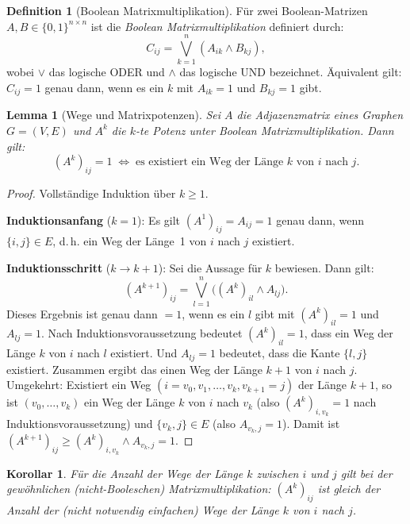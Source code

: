 ﻿\documentclass[a4paper,12pt,openany,oneside]{book}
\theoremstyle{definition}
\newtheorem{definition}{Definition}[chapter]
\theoremstyle{plain}
\newtheorem{lemma}{Lemma}[chapter]
\newtheorem{korollar}{Korollar}[chapter]
\theoremstyle{remark}
\begin{document}
\begin{definition}[Boolean Matrixmultiplikation]
  F\"ur zwei Boolean-Matrizen $A, B \in \{0,1\}^{n \times n}$ ist die
  \emph{Boolean Matrixmultiplikation} definiert durch:
  \[
    C_{ij} = \bigvee_{k=1}^{n} (A_{ik} \wedge B_{kj}),
  \]
  wobei $\vee$ das logische ODER und $\wedge$ das logische UND bezeichnet.
  \"Aquivalent gilt: $C_{ij} = 1$ genau dann, wenn es ein $k$ mit
  $A_{ik} = 1$ und $B_{kj} = 1$ gibt.
\end{definition}

\begin{lemma}[Wege und Matrixpotenzen]
  \label{lem:wege-matrizen}
  Sei $A$ die Adjazenzmatrix eines Graphen $G = (V,E)$ und $A^k$ die
  $k$-te Potenz unter Boolean Matrixmultiplikation. Dann gilt:
  \[
    (A^k)_{ij} = 1 \;\Leftrightarrow\;
    \text{es existiert ein Weg der L\"ange } k \text{ von } i \text{ nach } j.
  \]
\end{lemma}

\begin{proof}
  Vollst\"andige Induktion \"uber $k \geq 1$.

  \textbf{Induktionsanfang} ($k = 1$): Es gilt $(A^1)_{ij} = A_{ij} = 1$
  genau dann, wenn $\{i,j\} \in E$, d.\,h. ein Weg der L\"ange~1 von $i$
  nach $j$ existiert. \checkmark

  \textbf{Induktionsschritt} ($k \to k+1$): Sei die Aussage f\"ur $k$
  bewiesen. Dann gilt:
  \[
    (A^{k+1})_{ij} = \bigvee_{l=1}^{n}\bigl((A^k)_{il} \wedge A_{lj}\bigr).
  \]
  Dieses Ergebnis ist genau dann $= 1$, wenn es ein $l$ gibt mit
  $(A^k)_{il} = 1$ und $A_{lj} = 1$. Nach Induktionsvoraussetzung bedeutet
  $(A^k)_{il} = 1$, dass ein Weg der L\"ange $k$ von $i$ nach $l$ existiert.
  Und $A_{lj} = 1$ bedeutet, dass die Kante $\{l,j\}$ existiert. Zusammen
  ergibt das einen Weg der L\"ange $k+1$ von $i$ nach $j$.
  Umgekehrt: Existiert ein Weg $(i = v_0, v_1, \ldots, v_k, v_{k+1} = j)$
  der L\"ange $k+1$, so ist $(v_0, \ldots, v_k)$ ein Weg der L\"ange $k$ von
  $i$ nach $v_k$ (also $(A^k)_{i,v_k} = 1$ nach Induktionsvoraussetzung) und
  $\{v_k, j\} \in E$ (also $A_{v_k,j} = 1$). Damit ist
  $(A^{k+1})_{ij} \geq (A^k)_{i,v_k} \wedge A_{v_k,j} = 1$.
\end{proof}

\begin{korollar}
  F\"ur die Anzahl der Wege der L\"ange $k$ zwischen $i$ und $j$ gilt bei
  der gew\"ohnlichen (nicht-Booleschen) Matrixmultiplikation:
  $(A^k)_{ij}$ ist gleich der Anzahl der (nicht notwendig einfachen)
  Wege der L\"ange $k$ von $i$ nach $j$.
\end{korollar}
\end{document}
